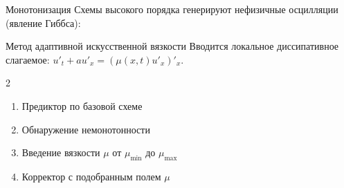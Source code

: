 \documentclass[12pt, aspectratio=169]{beamer}
\begin{document}
\begin{frame}{Монотонизация}
Схемы высокого порядка генерируют нефизичные осцилляции (явление Гиббса):
\begin{center}
\scalebox{0.75}{}
\end{center}
\end{frame}


\begin{frame}{Метод адаптивной искусственной вязкости}
    \vspace{.2cm}
    Вводится локальное диссипативное слагаемое:
    \(u'_t + a u'_x = \left(\mu(x,t) u'_x\right)'_x\).
    
    \begin{multicols}{2}
    \begin{enumerate}
        \vspace{-0.4cm}
        \item Предиктор по базовой схеме
        \item Обнаружение немонотонности
        \vspace{-0.4cm}
        \item Введение вязкости $\mu$ от $\mu_{\min}$ до $\mu_{\max}$
        \item Корректор с подобранным полем $\mu$
    \end{enumerate}
    \end{multicols}


    \begin{center}
    \vspace{0.15cm}
    \scalebox{0.7}{
      
    }
    \end{center}
\end{frame}
\end{document}
